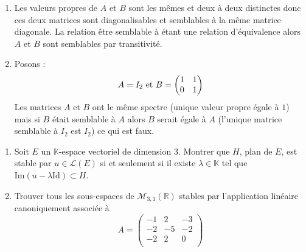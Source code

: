 \documentclass[a4paper,10pt]{report}
\begin{document}
\corr \begin{enumerate}
\item Les valeurs propres de $A$ et $B$ sont les mêmes et deux à deux distinctes donc ces deux matrices sont diagonalisables et semblables à la même matrice diagonale. La relation \og être semblable à \fg étant une relation d'équivalence alors $A$ et $B$ sont semblables par transitivité.
\item Posons :
$$ A = I_2 \hbox{ et } B = \begin{pmatrix}
1 & 1 \\
0 & 1 
\end{pmatrix}$$
Les matrices $A$ et $B$ ont le même spectre (unique valeur propre égale à $1$) mais si $B$ était semblable à $A$ alors $B$ serait égale à $A$ (l'unique matrice semblable à $I_2$ est $I_2$) ce qui est faux.
\end{enumerate}



\begin{Exercice}{} \begin{enumerate}
\item Soit $E$ un $\mathbb{K}$-espace vectoriel de dimension $3$. Montrer que $H$, plan de $E$, est stable par $u \in \mathcal{L}(E)$ si et seulement si il existe $\lambda \in \mathbb{K}$ tel que $\textrm{Im}(u- \lambda \textrm{Id}) \subset H$.
\item Trouver tous les sous-espaces de $\mathcal{M}_{3,1}(\mathbb{R})$ stables par l'application linéaire canoniquement associée à 
$$A= \begin{pmatrix}
-1 & 2 & -3 \\
-2 & -5 & -2 \\
-2 & 2 & 0 \\
\end{pmatrix} $$
\end{enumerate}
\end{Exercice}
\end{document}
